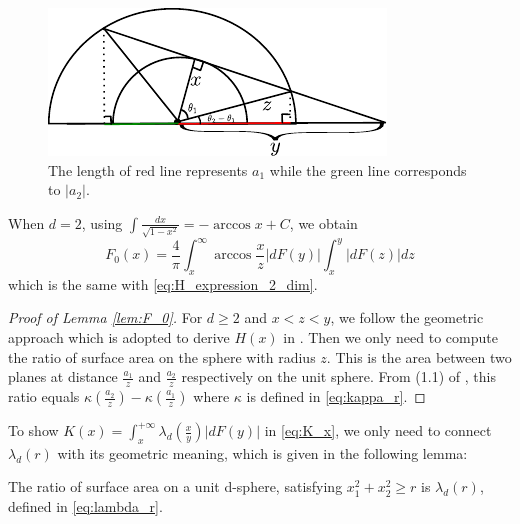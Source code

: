 \documentclass{aptpub}
\begin{document}
\begin{figure}[!ht]
     \centering
     \includegraphics[width=0.8\textwidth]{dessin.pdf}
     \caption{The length of red line represents $a_1$ while the green line corresponds to $|a_2|$.}
     \label{fig:a1a2}
\end{figure}
When $d=2$, using $\int \frac{dx}{\sqrt{1-x^2}} = -\arccos x + C$,
we obtain
$$
F_0(x)=\frac{4}{\pi} \int_x^{\infty} \arccos\frac{x}{z}|dF(y)|
\int_x^{y} |dF(z)|dz
$$
which is the same with \eqref{eq:H_expression_2_dim}.
\begin{proof}[Proof of Lemma \ref{lem:F_0}]
For $d\geq 2$ and $x<z<y$, we follow the geometric approach
which is adopted to derive
$H(x)$ in \cite{carnal1970konvexe}.
Then we only need to compute the ratio of surface area
on the sphere with radius $z$. This is the area between
two planes at distance $\frac{a_1}{z}$ and $\frac{a_2}{z}$
respectively on the unit sphere. From (1.1) of \cite{dwyer1991convex},
this ratio equals $\kappa(\frac{a_2}{z}) - \kappa(\frac{a_1}{z})$
where $\kappa$ is defined in \eqref{eq:kappa_r}.

\end{proof}
To show 
$K(x) = \int_x^{+\infty} \lambda_d(\frac{x}{y})|dF(y)|$
in \eqref{eq:K_x},
we only need to connect $\lambda_d(r)$ with its geometric meaning,
which is given in the following lemma:
\begin{lemma}
     The ratio of surface area on a unit d-sphere,
     satisfying $x_1^2+x_2^2\geq r$ is $\lambda_d(r)$,
     defined in \eqref{eq:lambda_r}.
\end{lemma}
\end{document}
